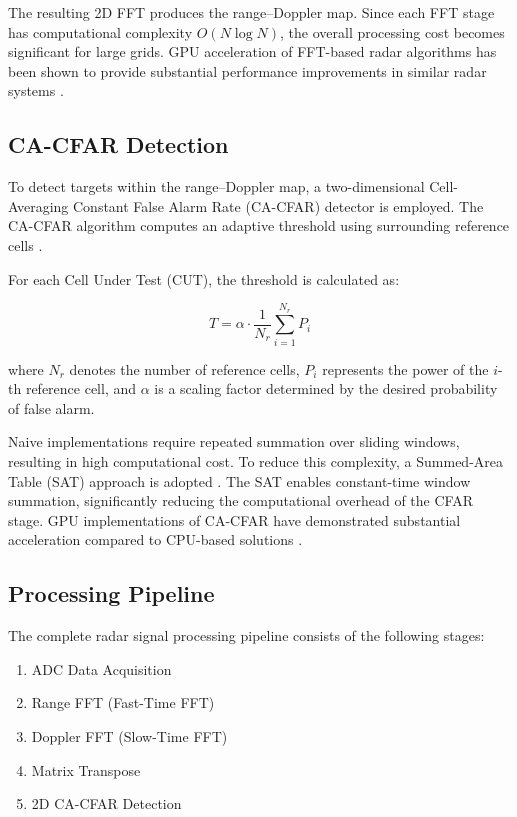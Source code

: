 \documentclass[conference, a4paper]{IEEEtran}
\begin{document}
The resulting 2D FFT produces the range–Doppler map. Since each FFT stage has computational complexity $O(N \log N)$, the overall processing cost becomes significant for large grids. GPU acceleration of FFT-based radar algorithms has been shown to provide substantial performance improvements in similar radar systems \cite{jung2023,zhao2023,liu2023}.

\subsection{CA-CFAR Detection}

To detect targets within the range–Doppler map, a two-dimensional Cell-Averaging Constant False Alarm Rate (CA-CFAR) detector is employed. The CA-CFAR algorithm computes an adaptive threshold using surrounding reference cells \cite{venter2011}.

For each Cell Under Test (CUT), the threshold is calculated as:

\begin{equation}
T = \alpha \cdot \frac{1}{N_r} \sum_{i=1}^{N_r} P_i
\end{equation}

where $N_r$ denotes the number of reference cells, $P_i$ represents the power of the $i$-th reference cell, and $\alpha$ is a scaling factor determined by the desired probability of false alarm.

Naive implementations require repeated summation over sliding windows, resulting in high computational cost. To reduce this complexity, a Summed-Area Table (SAT) approach is adopted \cite{crow1984}. The SAT enables constant-time window summation, significantly reducing the computational overhead of the CFAR stage. GPU implementations of CA-CFAR have demonstrated substantial acceleration compared to CPU-based solutions \cite{venter2011}.

\subsection{Processing Pipeline}

The complete radar signal processing pipeline consists of the following stages:

\begin{enumerate}
    \item ADC Data Acquisition
    \item Range FFT (Fast-Time FFT)
    \item Doppler FFT (Slow-Time FFT)
    \item Matrix Transpose
    \item 2D CA-CFAR Detection
\end{enumerate}
\end{document}
